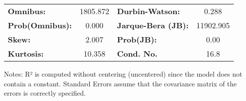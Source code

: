 \begin{center}
\begin{tabular}{lcccccc}
\bottomrule
\end{tabular}
\begin{tabular}{lclc}
\textbf{Omnibus:}       & 1805.872 & \textbf{  Durbin-Watson:     } &     0.288  \\
\textbf{Prob(Omnibus):} &   0.000  & \textbf{  Jarque-Bera (JB):  } & 11902.905  \\
\textbf{Skew:}          &   2.007  & \textbf{  Prob(JB):          } &      0.00  \\
\textbf{Kurtosis:}      &  10.358  & \textbf{  Cond. No.          } &      16.8  \\
\bottomrule
\end{tabular}
\end{center}

Notes: \newline
 [1] R² is computed without centering (uncentered) since the model does not contain a constant. \newline
 [2] Standard Errors assume that the covariance matrix of the errors is correctly specified.